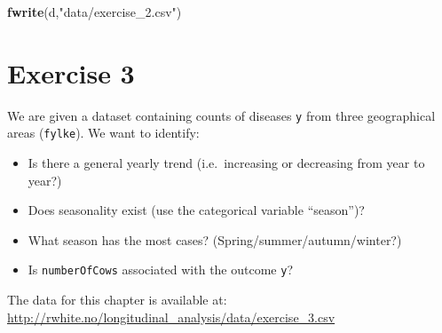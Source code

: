 \documentclass[]{book}
\newenvironment{Shaded}{\begin{snugshade}}{\end{snugshade}}
\newcommand{\KeywordTok}[1]{\textcolor[rgb]{0.13,0.29,0.53}{\textbf{#1}}}
\newcommand{\StringTok}[1]{\textcolor[rgb]{0.31,0.60,0.02}{#1}}
\newcommand{\NormalTok}[1]{#1}
\providecommand{\tightlist}{%
  \setlength{\itemsep}{0pt}\setlength{\parskip}{0pt}}
\begin{document}
\begin{Shaded}
\begin{Highlighting}[]
\KeywordTok{fwrite}\NormalTok{(d,}\StringTok{"data/exercise_2.csv"}\NormalTok{)}
\end{Highlighting}
\end{Shaded}

\newpage

\section{Exercise 3}\label{exercise-3}

We are given a dataset containing counts of diseases \texttt{y} from
three geographical areas (\texttt{fylke}). We want to identify:

\begin{itemize}
\tightlist
\item
  Is there a general yearly trend (i.e.~increasing or decreasing from
  year to year?)
\item
  Does seasonality exist (use the categorical variable ``season'')?
\item
  What season has the most cases? (Spring/summer/autumn/winter?)
\item
  Is \texttt{numberOfCows} associated with the outcome \texttt{y}?
\end{itemize}

The data for this chapter is available at:
\url{http://rwhite.no/longitudinal_analysis/data/exercise_3.csv}
\end{document}

